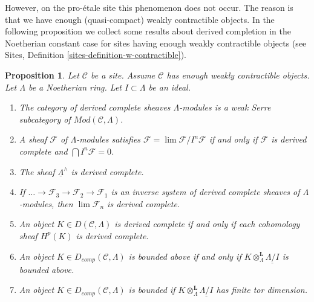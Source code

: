 \documentclass{stacks-project}
\theoremstyle{plain}
\newtheorem{proposition}[subsection]{Proposition}
\theoremstyle{definition}
\theoremstyle{remark}
\numberwithin{equation}{subsection}
\def\lim{\mathop{\mathrm{lim}}\nolimits}
\begin{document}
\medskip\noindent
However, on the pro-\'etale site this phenomenon does not occur.
The reason is that we have enough (quasi-compact) weakly contractible objects.
In the following proposition we collect some results about derived
completion in the Noetherian constant case for sites having enough
weakly contractible objects (see
Sites, Definition \ref{sites-definition-w-contractible}).

\begin{proposition}
\label{proposition-enough-weakly-contractibles}
Let $\mathcal{C}$ be a site. Assume $\mathcal{C}$ has enough
weakly contractible objects.
Let $\Lambda$ be a Noetherian ring. Let $I \subset \Lambda$ be an ideal.
\begin{enumerate}
\item The category of derived complete sheaves $\Lambda$-modules is a
weak Serre subcategory of $\textit{Mod}(\mathcal{C}, \Lambda)$.
\item A sheaf $\mathcal{F}$ of $\Lambda$-modules satisfies
$\mathcal{F} = \lim \mathcal{F}/I^n\mathcal{F}$ if and only if
$\mathcal{F}$ is derived complete and $\bigcap I^n\mathcal{F} = 0$.
\item The sheaf $\underline{\Lambda}^\wedge$ is derived complete.
\item If $\ldots \to \mathcal{F}_3 \to \mathcal{F}_2 \to \mathcal{F}_1$
is an inverse system of derived complete sheaves of $\Lambda$-modules,
then $\lim \mathcal{F}_n$ is derived complete.
\item An object $K \in D(\mathcal{C}, \Lambda)$ is derived complete if
and only if each cohomology sheaf $H^p(K)$ is derived complete.
\item An object $K \in D_{comp}(\mathcal{C}, \Lambda)$ is bounded above
if and only if $K \otimes_\Lambda^\mathbf{L} \underline{\Lambda/I}$
is bounded above.
\item An object $K \in D_{comp}(\mathcal{C}, \Lambda)$ is bounded
if $K \otimes_\Lambda^\mathbf{L} \underline{\Lambda/I}$ has finite
tor dimension.
\end{enumerate}
\end{proposition}
\end{document}
